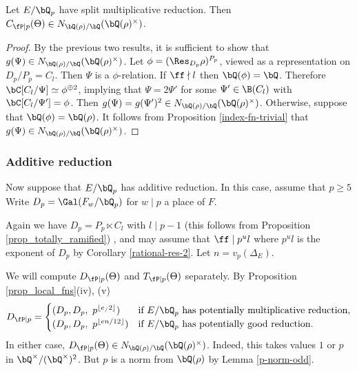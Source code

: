 \begin{cor}
Let $E / \bQ_p$ have split multiplicative reduction. Then $C_{\fP \mid p}(\Theta) \in \fieldnorm{\rho}$.
\end{cor}

\begin{proof}
By the previous two results, it is sufficient to show that $g(\Psi) \in \fieldnorm{\rho}$. Let $\phi = (\Res_{D_p} \rho)^{P_p}$, viewed as a representation on $D_p / P_p = C_l$. Then $\Psi$ is a $\phi$-relation. If $\ff \nmid l$ then $\bQ(\phi) = \bQ$. Therefore $\bC[C_l / \Psi] \simeq \phi^{\oplus 2}$, implying that $\Psi = 2\Psi'$ for some $\Psi' \in \B(C_l)$ with $\bC[C_l / \Psi'] = \phi$. Then $g(\Psi) = g(\Psi')^2 \in \fieldnorm{\rho}$. Otherwise, suppose that $\bQ(\phi) = \bQ(\rho)$. It follows from Proposition \ref{index-fn-trivial} that $g(\Psi) \in \fieldnorm{\rho}$.
\end{proof}

\subsubsection*{Additive reduction}

Now suppose that $E / \bQ_p$ has additive reduction. In this case, assume that $p \geq 5$
Write $D_p = \Gal(F_w / \bQ_p)$ for $w \mid p$ a place of $F$.

Again we have $D_p = P_p \ltimes C_l$ with $ l \mid p - 1$ (this follows from Proposition \ref{prop_totally_ramified}) , and may assume that $\ff \mid p^u l$ where $p^u l $ is the exponent of $D_p$ by Corollary \ref{rational-res-2}. Let $n = v_p(\Delta_E)$. 

We will compute $D_{\fP \mid p}(\Theta)$ and $T_{\fP \mid p}(\Theta)$ separately. 
By Proposition \ref{prop_local_fns}(iv), (v)
\[ D_{\fP \mid p} = 
    \begin{cases}
        (D_p, D_p,\ p^{\floor{e_ /2}}) & \text{if } E / \bQ_p \text{ has potentially multiplicative reduction}, \\
        (D_p, D_p,\ p^{\floor{en /12}}) & \text{if } E / \bQ_p \text { has potentially good reduction}.
    \end{cases}
    \]
In either case, $D_{\fP \mid p}(\Theta) \in N_{\bQ(\rho) / \bQ}(\bQ(\rho)^{\times})$. Indeed, this takes values $1$ or $p$ in $\bQ^{\times} / (\bQ^{\times})^2$. But $p$ is a norm from $\bQ(\rho)$ by Lemma \ref{p-norm-odd}.

\vspace{1em}

